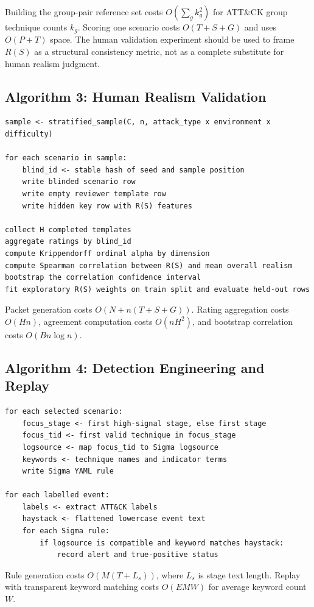 Building the group-pair reference set costs $O(\sum_g k_g^2)$ for ATT\&CK
group technique counts $k_g$. Scoring one scenario costs $O(T+S+G)$ and uses
$O(P+T)$ space. The human validation experiment should be used to frame $R(S)$
as a structural consistency metric, not as a complete substitute for human
realism judgment.

\subsection{Algorithm 3: Human Realism Validation}

\begin{verbatim}
sample <- stratified_sample(C, n, attack_type x environment x difficulty)

for each scenario in sample:
    blind_id <- stable hash of seed and sample position
    write blinded scenario row
    write empty reviewer template row
    write hidden key row with R(S) features

collect H completed templates
aggregate ratings by blind_id
compute Krippendorff ordinal alpha by dimension
compute Spearman correlation between R(S) and mean overall realism
bootstrap the correlation confidence interval
fit exploratory R(S) weights on train split and evaluate held-out rows
\end{verbatim}

Packet generation costs $O(N+n(T+S+G))$. Rating aggregation costs $O(Hn)$,
agreement computation costs $O(nH^2)$, and bootstrap correlation costs
$O(Bn\log n)$.

\subsection{Algorithm 4: Detection Engineering and Replay}

\begin{verbatim}
for each selected scenario:
    focus_stage <- first high-signal stage, else first stage
    focus_tid <- first valid technique in focus_stage
    logsource <- map focus_tid to Sigma logsource
    keywords <- technique names and indicator terms
    write Sigma YAML rule

for each labelled event:
    labels <- extract ATT&CK labels
    haystack <- flattened lowercase event text
    for each Sigma rule:
        if logsource is compatible and keyword matches haystack:
            record alert and true-positive status
\end{verbatim}

Rule generation costs $O(M(T+L_s))$, where $L_s$ is stage text length. Replay
with transparent keyword matching costs $O(EMW)$ for average keyword count $W$.

